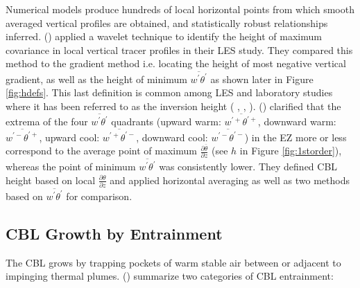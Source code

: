 Numerical models produce hundreds of local horizontal points from which smooth averaged vertical profiles are obtained, and statistically robust relationships inferred. \citeauthor{BrooksFowler2} (\citeyear{BrooksFowler2}) applied a wavelet technique to identify the height of maximum covariance in local vertical tracer profiles in their \acs{LES} study.  They compared this method to the gradient method i.e. locating the height of most negative vertical gradient, as well as the height of minimum $\overline{w^{'}\theta^{'}}$ as shown later in Figure \ref{fig:hdefs}.  This last definition is common among \acs{LES} and laboratory studies where it has been referred to as the inversion height (\citeauthor{DearWill80} \citeyear{DearWill80}, \citeauthor{Sorbjan1} \citeyear{Sorbjan1}, \citeauthor{FedConzMir04} \citeyear{FedConzMir04}).  \citeauthor{SullMoengStev} (\citeyear{SullMoengStev}) clarified that the extrema of the four $\overline{w^{'}\theta^{'}}$ quadrants (upward warm: $\overline{w^{'+}\theta^{'+}}$, downward warm: $\overline{w^{'-}\theta^{'+}}$, upward cool: $\overline{w^{'+}\theta^{'-}}$, downward cool: $\overline{w^{'-}\theta^{'-}}$) in the \acs{EZ} more or less correspond to the average point of maximum $\frac{\partial \overline{\theta}}{\partial z}$ (see $h$ in Figure \ref{fig:1storder}), whereas the point of minimum $\overline{w^{'}\theta^{'}}$ was consistently lower. They defined \acs{CBL} height based on local $\frac{\partial \theta}{\partial z}$ and applied horizontal averaging as well as two methods based on $\overline{w^{'}\theta^{'}}$
for comparison.\\


\subsection{CBL Growth by Entrainment}
\label{subsec:cblgrowth}

The \acs{CBL} grows by trapping pockets of warm stable air between
or adjacent to impinging thermal plumes.  \citeauthor{Traum11} (\citeyear{Traum11}) summarize two categories of \acs{CBL} entrainment:\\

